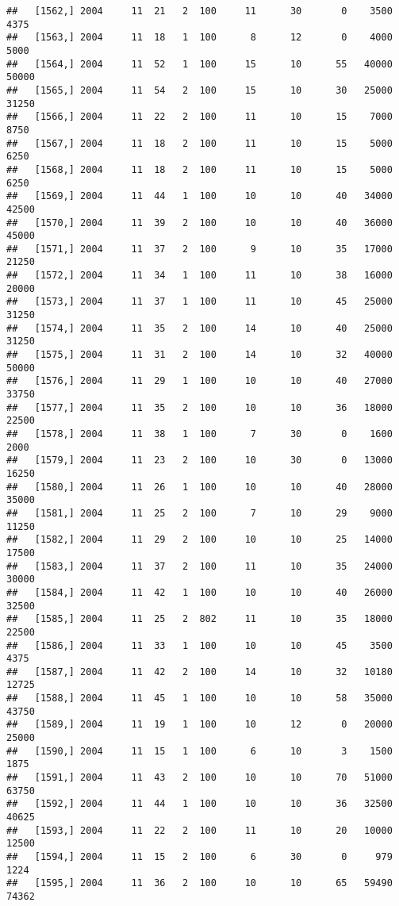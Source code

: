 \documentclass{article}\usepackage[]{graphicx}\usepackage[]{color}
\makeatletter
\newenvironment{kframe}{%
 \def\at@end@of@kframe{}%
 \ifinner\ifhmode%
  \def\at@end@of@kframe{\end{minipage}}%
  \begin{minipage}{\columnwidth}%
 \fi\fi%
 \def\FrameCommand##1{\hskip\@totalleftmargin \hskip-\fboxsep
 \colorbox{shadecolor}{##1}\hskip-\fboxsep
     \hskip-\linewidth \hskip-\@totalleftmargin \hskip\columnwidth}%
 \MakeFramed {\advance\hsize-\width
   \@totalleftmargin\z@ \linewidth\hsize
   \@setminipage}}%
 {\par\unskip\endMakeFramed%
 \at@end@of@kframe}
\newenvironment{knitrout}{}{} %
\makeatother
\begin{document}
\begin{knitrout}
\begin{kframe}
\begin{verbatim}
##   [1562,] 2004     11  21   2  100     11      30       0    3500    4375
##   [1563,] 2004     11  18   1  100      8      12       0    4000    5000
##   [1564,] 2004     11  52   1  100     15      10      55   40000   50000
##   [1565,] 2004     11  54   2  100     15      10      30   25000   31250
##   [1566,] 2004     11  22   2  100     11      10      15    7000    8750
##   [1567,] 2004     11  18   2  100     11      10      15    5000    6250
##   [1568,] 2004     11  18   2  100     11      10      15    5000    6250
##   [1569,] 2004     11  44   1  100     10      10      40   34000   42500
##   [1570,] 2004     11  39   2  100     10      10      40   36000   45000
##   [1571,] 2004     11  37   2  100      9      10      35   17000   21250
##   [1572,] 2004     11  34   1  100     11      10      38   16000   20000
##   [1573,] 2004     11  37   1  100     11      10      45   25000   31250
##   [1574,] 2004     11  35   2  100     14      10      40   25000   31250
##   [1575,] 2004     11  31   2  100     14      10      32   40000   50000
##   [1576,] 2004     11  29   1  100     10      10      40   27000   33750
##   [1577,] 2004     11  35   2  100     10      10      36   18000   22500
##   [1578,] 2004     11  38   1  100      7      30       0    1600    2000
##   [1579,] 2004     11  23   2  100     10      30       0   13000   16250
##   [1580,] 2004     11  26   1  100     10      10      40   28000   35000
##   [1581,] 2004     11  25   2  100      7      10      29    9000   11250
##   [1582,] 2004     11  29   2  100     10      10      25   14000   17500
##   [1583,] 2004     11  37   2  100     11      10      35   24000   30000
##   [1584,] 2004     11  42   1  100     10      10      40   26000   32500
##   [1585,] 2004     11  25   2  802     11      10      35   18000   22500
##   [1586,] 2004     11  33   1  100     10      10      45    3500    4375
##   [1587,] 2004     11  42   2  100     14      10      32   10180   12725
##   [1588,] 2004     11  45   1  100     10      10      58   35000   43750
##   [1589,] 2004     11  19   1  100     10      12       0   20000   25000
##   [1590,] 2004     11  15   1  100      6      10       3    1500    1875
##   [1591,] 2004     11  43   2  100     10      10      70   51000   63750
##   [1592,] 2004     11  44   1  100     10      10      36   32500   40625
##   [1593,] 2004     11  22   2  100     11      10      20   10000   12500
##   [1594,] 2004     11  15   2  100      6      30       0     979    1224
##   [1595,] 2004     11  36   2  100     10      10      65   59490   74362

\end{verbatim}
\end{kframe}
\end{knitrout}
\end{document}
